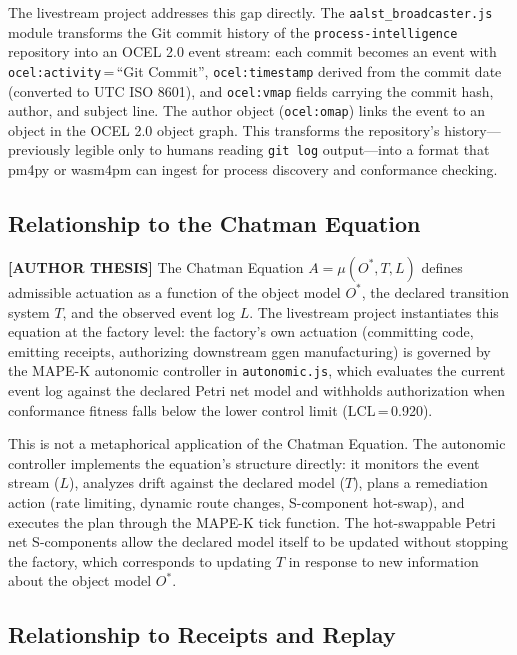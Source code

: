The livestream project addresses this gap directly. The \texttt{aalst\_broadcaster.js}
module transforms the Git commit history of the \texttt{process-intelligence}
repository into an OCEL 2.0 event stream: each commit becomes an event with
\texttt{ocel:activity}\,=\,``Git Commit'', \texttt{ocel:timestamp} derived from
the commit date (converted to UTC ISO 8601), and \texttt{ocel:vmap} fields carrying
the commit hash, author, and subject line. The author object (\texttt{ocel:omap})
links the event to an object in the OCEL 2.0 object graph. This transforms the
repository's history---previously legible only to humans reading \texttt{git log}
output---into a format that pm4py or wasm4pm can ingest for process discovery and
conformance checking.

\subsection{Relationship to the Chatman Equation}
\label{sec:livestream-lineage-chatman-equation}

\textbf{[AUTHOR THESIS]} The Chatman Equation $A = \mu(O^*, T, L)$ defines
admissible actuation as a function of the object model $O^*$, the declared
transition system $T$, and the observed event log $L$. The livestream project
instantiates this equation at the factory level: the factory's own actuation
(committing code, emitting receipts, authorizing downstream ggen manufacturing)
is governed by the MAPE-K autonomic controller in \texttt{autonomic.js}, which
evaluates the current event log against the declared Petri net model and withholds
authorization when conformance fitness falls below the lower control limit
(LCL\,=\,0.920).

This is not a metaphorical application of the Chatman Equation. The autonomic
controller implements the equation's structure directly: it monitors the event
stream ($L$), analyzes drift against the declared model ($T$), plans a remediation
action (rate limiting, dynamic route changes, S-component hot-swap), and executes
the plan through the MAPE-K tick function. The hot-swappable Petri net S-components
allow the declared model itself to be updated without stopping the factory, which
corresponds to updating $T$ in response to new information about the object model
$O^*$.

\subsection{Relationship to Receipts and Replay}
\label{sec:livestream-lineage-receipts-replay}

